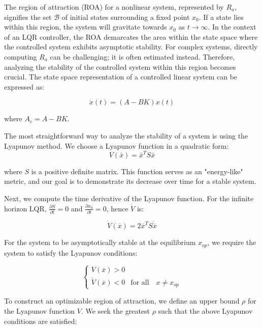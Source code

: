 The region of attraction (ROA) for a nonlinear system, represented by \(R_a\), signifies the set \(\mathcal{B}\) of initial states surrounding a fixed point \(x_0\). If a state lies within this region, the system will gravitate towards \(x_0\) as \(t \rightarrow \infty\). In the context of an LQR controller, the ROA demarcates the area within the state space where the controlled system exhibits asymptotic stability. For complex systems, directly computing \(R_a\) can be challenging; it is often estimated instead. Therefore, analyzing the stability of the controlled system within this region becomes crucial. The state space representation of a controlled linear system can be expressed as:

\begin{equation}
\dot{x}(t) = (A - BK)x(t)
\end{equation}

where \(A_c = A - BK\).

The most straightforward way to analyze the stability of a system is using the Lyapunov method. We choose a Lyapunov function in a quadratic form:
\begin{equation}
  V(\bar{x}) = \bar{x}^T S \bar{x} 
\end{equation}

where \(S\) is a positive definite matrix. This function serves as an "energy-like" metric, and our goal is to demonstrate its decrease over time for a stable system.

Next, we compute the time derivative of the Lyapunov function. For the infinite horizon LQR, \(\frac{\partial S}{\partial t} = 0\) and \(\frac{\partial x_0}{\partial t} = 0\), hence \(\dot{V}\) is:

\begin{equation}
\dot{V}(\overline{x}) = 2\overline{x}^{T}S\dot{\overline{x}}
\end{equation}

For the system to be asymptotically stable at the equilibrium \(x_{op}\), we require the system to satisfy the Lyapunov conditions:

\begin{equation}
\begin{cases}
   V(\overline{x}) > 0 \\
   \dot{V}(\overline{x}) < 0 & \text{for all} \quad x \neq x_{op}
\end{cases}
\end{equation}

To construct an optimizable region of attraction, we define an upper bound \(\rho\) for the Lyapunov function \(V\). We seek the greatest \(\rho\) such that the above Lyapunov conditions are satisfied:

